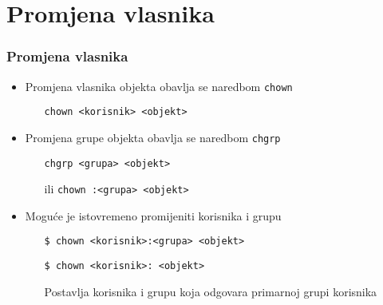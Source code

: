 \documentclass[table,usenames,dvipsnames] {beamer}
\newcommand{\shell}[1]{\texttt{#1}}
\begin{document}
\section{Promjena vlasnika}
\begin{frame}[t]
\frametitle{Promjena vlasnika}
\begin{itemize}
  \item Promjena vlasnika objekta obavlja se naredbom \shell{chown}
  \begin{itemize}
    \item[] \shell{chown <korisnik> <objekt>}
  \end{itemize}
  \item Promjena grupe objekta obavlja se naredbom \shell{chgrp}
  \begin{itemize}
    \item[] \shell{chgrp <grupa> <objekt>}
    \item[ili] \shell{chown :<grupa> <objekt>}
  \end{itemize}
\end{itemize}
\vfill
\begin{itemize}
  \item Moguće je istovremeno promijeniti korisnika i grupu
  \begin{itemize}
    \item[] \shell{\$ chown <korisnik>:<grupa> <objekt>}
    \item[] \vspace{1em} \shell{\$ chown <korisnik>: <objekt>}
  \item[] Postavlja korisnika i grupu koja odgovara primarnoj grupi korisnika
  \end{itemize}
\end{itemize}
\end{frame}
\end{document}
